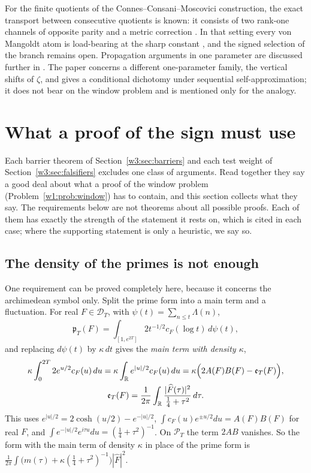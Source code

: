 \documentclass[11pt]{amsart}
\theoremstyle{definition}
\theoremstyle{remark}
\numberwithin{equation}{section}
\newcommand{\R}{\mathbb{R}}
\newcommand{\Fh}{\widehat F}                           %
\newcommand{\cF}{c_F}                                  %
\newcommand{\PT}{\mathcal{P}_T}                        %
\newcommand{\DT}{\mathcal{D}_T}                        %
\newcommand{\pT}{\mathfrak{p}_T}                       %
\begin{document}
For the finite quotients of the Connes--Consani--Moscovici construction, the exact transport between
consecutive quotients is known: it consists of two rank-one channels of opposite parity and a metric correction
\cite[Theorem~4.1 and the theorem `Complete transport defect' of \S5]{P39}. In that setting every von Mangoldt
atom is load-bearing at the sharp constant \cite[Theorem~24.1]{P39}, and the signed selection of the branch
remains open. Propagation arguments in one parameter are discussed further in \cite{P27,P29}. The paper
\cite{P30} concerns a different one-parameter family, the vertical shifts of $\zeta$, and gives a conditional
dichotomy under sequential self-approximation; it does not bear on the window problem and is mentioned only for
the analogy.

\section{What a proof of the sign must use}\label{w8:sec:constraints}

Each barrier theorem of Section~\ref{w3:sec:barriers} and each test weight of Section~\ref{w3:sec:falsifiers}
excludes one class of arguments. Read together they say a good deal about what a proof of the window problem
(Problem~\ref{w1:prob:window}) has to contain, and this section collects what they say. The requirements below are
not theorems about all possible proofs. Each of them has exactly the strength of the statement it rests on, which
is cited in each case; where the supporting statement is only a heuristic, we say so.

\subsection{The density of the primes is not enough}

One requirement can be proved completely here, because it concerns the archimedean symbol only. Split the prime
form into a main term and a fluctuation. For real $F\in\DT$, with $\psi(t)=\sum_{n\le t}\Lambda(n)$,
\[
\pT(F)=\int_{[1,e^{2T}]}2t^{-1/2}\cF(\log t)\,d\psi(t),
\]
and replacing $d\psi(t)$ by $\kappa\,dt$ gives the \emph{main term with density $\kappa$},
\begin{gather*}
\kappa\int_0^{2T}2e^{u/2}\cF(u)\,du=\kappa\int_\R e^{|u|/2}\cF(u)\,du
=\kappa\Bigl(2A(F)B(F)-\mathfrak e_T(F)\Bigr),\\
\mathfrak e_T(F)=\frac1{2\pi}\int_\R\frac{|\Fh(\tau)|^2}{\frac14+\tau^2}\,d\tau .
\end{gather*}
This uses $e^{|u|/2}=2\cosh(u/2)-e^{-|u|/2}$, $\int\cF(u)e^{\pm u/2}du=A(F)B(F)$ for real $F$, and
$\int e^{-|u|/2}e^{i\tau u}du=(\frac14+\tau^2)^{-1}$. On $\PT$ the term $2AB$ vanishes. So the form with the
main term of density $\kappa$ in place of the prime form is
$\frac1{2\pi}\int\bigl(m(\tau)+\kappa(\tfrac14+\tau^2)^{-1}\bigr)|\Fh|^2$.
\end{document}
